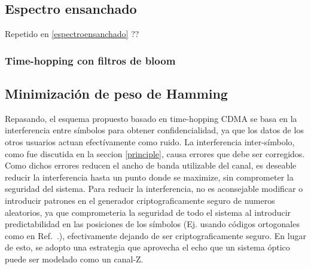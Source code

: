 \documentclass[a4paper,10pt]{report}
\begin{document}
\subsection{Espectro ensanchado}

Repetido en \ref{espectroensanchado} ??
\subsubsection{Time-hopping con filtros de bloom}

\subsection{Minimización de peso de Hamming}

Repasando, el esquema propuesto basado en time-hopping CDMA se basa en la interferencia entre símbolos para obtener confidencialidad, ya que los datos de los otros usuarios actuan efectívamente como ruido.
La interferencia inter-símbolo, como fue discutida en la seccion \ref{principle}, causa errores que debe ser corregidos. Como dichos errores reducen el ancho de banda utilizable del canal, es deseable reducir la interferencia hasta un punto donde se maximize, sin comprometer la seguridad del sistema. Para reducir la interferencia, no es aconsejable modificar o introducir patrones en el generador criptograficamente seguro de numeros aleatorios, ya que comprometeria la seguridad de todo el sistema al introducir predictabilidad en las posiciones de los símbolos (Ej. usando códigos ortogonales como en Ref.~\cite{Nadarajah2006}.), efectivamente dejando de ser criptograficamente seguro.
En lugar de esto, se adopto una estrategia que aprovecha el echo que un sistema óptico puede ser modelado como un canal-Z.

\end{document}

